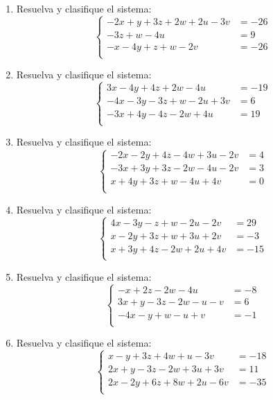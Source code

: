 \documentclass[11pt]{article}
\begin{document}
\begin{enumerate}
\[\]
\item Resuelva y clasifique el sistema:
\[
\left\{\begin{aligned}
-2x+y+3z+2w+2u-3v&=-26\\
-3z+w-4u&=9\\
-x-4y+z+w-2v&=-26\\
\end{aligned}\right.
\]
\item Resuelva y clasifique el sistema:
\[
\left\{\begin{aligned}
3x-4y+4z+2w-4u&=-19\\
-4x-3y-3z+w-2u+3v&=6\\
-3x+4y-4z-2w+4u&=19\\
\end{aligned}\right.
\]
\item Resuelva y clasifique el sistema:
\[
\left\{\begin{aligned}
-2x-2y+4z-4w+3u-2v&=4\\
-3x+3y+3z-2w-4u-2v&=3\\
x+4y+3z+w-4u+4v&=0\\
\end{aligned}\right.
\]
\item Resuelva y clasifique el sistema:
\[
\left\{\begin{aligned}
4x-3y-z+w-2u-2v&=29\\
x-2y+3z+w+3u+2v&=-3\\
x+3y+4z-2w+2u+4v&=-15\\
\end{aligned}\right.
\]
\item Resuelva y clasifique el sistema:
\[
\left\{\begin{aligned}
-x+2z-2w-4u&=-8\\
3x+y-3z-2w-u-v&=6\\
-4x-y+w-u+v&=-1\\
\end{aligned}\right.
\]
\item Resuelva y clasifique el sistema:
\[
\left\{\begin{aligned}
x-y+3z+4w+u-3v&=-18\\
2x+y-3z-2w+3u+3v&=11\\
2x-2y+6z+8w+2u-6v&=-35\\
\end{aligned}\right.
\]
\end{enumerate}
\end{document}
